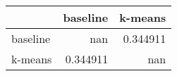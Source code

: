 \begin{tabular}{lrr}
\toprule
          &   baseline &    k-means \\
\midrule
 baseline & nan        &   0.344911 \\
 k-means  &   0.344911 & nan        \\
\bottomrule
\end{tabular}